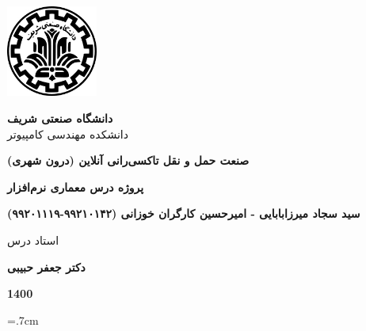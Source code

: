 \thispagestyle{empty}
\begin{center}
\includegraphics[height=3cm]{sut_logo.png}
\vspace{0.4cm}

{\large
	\textbf{دانشگاه صنعتی شریف}\\
	دانشکده مهندسی کامپیوتر
}
\vspace{3.5cm}

{\LARGE
	\textbf{صنعت حمل و نقل تاکسی‌رانی آنلاین (درون شهری)}\\
}
\vspace{3.5cm}

{\large
	\textbf{پروژه درس معماری نرم‌افزار}\\
}
\vspace{1cm}

{\Large
	\textbf{سید سجاد میرزابابایی - امیرحسین کارگران خوزانی (٩٩٢١٠١۴٢-۹۹۲۰۱۱۱۹)}\\
}
\vspace{2.5cm}

{\large
	استاد درس\\
}
\vspace{0.5cm}

{\Large
	\textbf{دکتر جعفر حبیبی}\\
}
\vspace{3.5cm}

{\Large
	\textbf{1400}
}

\end{center}
\restoregeometry
\pagebreak

%
%
%	
%


\baselineskip=.7cm

